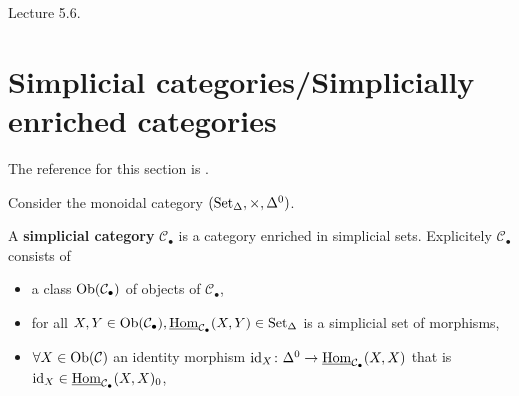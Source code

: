Lecture 5.6.

\section{Simplicial categories/Simplicially enriched categories}

The reference for this section is \cite[section 2.4]{kerodon}.

Consider the monoidal category $ ( \operatorname{Set}_{\Delta} , \times , \Delta^0 ) $.

\begin{defi}
	A \textbf{simplicial category} $ \mathcal{ C }_\bullet $ is a category enriched in simplicial sets.
	Explicitely $ \mathcal{ C }_\bullet $ consists of 
	\begin{itemize}
		\item 
		a class $ \operatorname{Ob} ( \mathcal{ C }_\bullet ) $ of objects of $ \mathcal{ C }_\bullet $,
		
		\item 
		for all $ X , Y \in \operatorname{Ob} ( \mathcal{ C }_\bullet ), \underline{ \operatorname{Hom}}_{ \mathcal{ C }_\bullet } ( X , Y ) \in \operatorname{Set}_{\Delta} $ is a simplicial set of morphisms,
			
		\item
		$ \forall X \in \operatorname{Ob} ( \mathcal{ C } ) $ an identity morphism $ \operatorname{id}_X \colon \Delta^0 \to \underline{ \operatorname{Hom} }_{ \mathcal{ C }_\bullet } ( X , X ) $ that is $ \operatorname{id}_X \in \underline{ \operatorname{Hom} }_{ \mathcal{ C }_\bullet } ( X , X )_0 $,
		

\end{itemize}
\end{defi}
